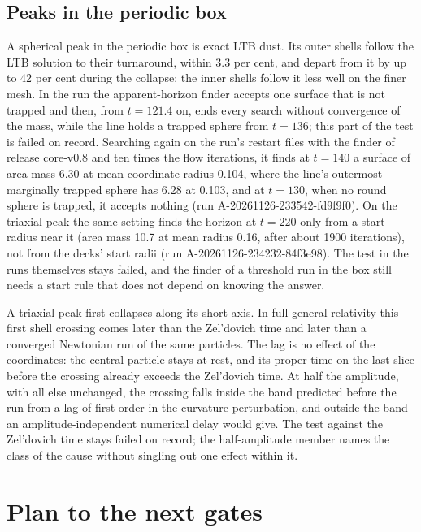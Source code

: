 \documentclass[aps,prd,twocolumn,10pt,superscriptaddress,nofootinbib,longbibliography,floatfix]{revtex4-2}
\begin{document}
\subsection{Peaks in the periodic box}\label{sec:verify_box}

A spherical peak in the periodic box is exact LTB dust. Its outer shells follow the LTB solution to their turnaround, within 3.3 per cent, and depart from it by up to 42 per cent during the collapse; the inner shells follow it less well on the finer mesh. In the run the apparent-horizon finder accepts one surface that is not trapped and then, from $t = 121.4$ on, ends every search without convergence of the mass, while the line holds a trapped sphere from $t = 136$; this part of the test is failed on record. Searching again on the run's restart files with the finder of release core-v0.8 and ten times the flow iterations, it finds at $t = 140$ a surface of area mass 6.30 at mean coordinate radius 0.104, where the line's outermost marginally trapped sphere has 6.28 at 0.103, and at $t = 130$, when no round sphere is trapped, it accepts nothing (run A-20261126-233542-fd9f9f0). On the triaxial peak the same setting finds the horizon at $t = 220$ only from a start radius near it (area mass 10.7 at mean radius 0.16, after about 1900 iterations), not from the decks' start radii (run A-20261126-234232-84f3e98). The test in the runs themselves stays failed, and the finder of a threshold run in the box still needs a start rule that does not depend on knowing the answer.

A triaxial peak first collapses along its short axis. In full general relativity this first shell crossing comes later than the Zel'dovich time and later than a converged Newtonian run of the same particles. The lag is no effect of the coordinates: the central particle stays at rest, and its proper time on the last slice before the crossing already exceeds the Zel'dovich time. At half the amplitude, with all else unchanged, the crossing falls inside the band predicted before the run from a lag of first order in the curvature perturbation, and outside the band an amplitude-independent numerical delay would give. The test against the Zel'dovich time stays failed on record; the half-amplitude member names the class of the cause without singling out one effect within it.

\section{Plan to the next gates}\label{sec:plan}
\end{document}
